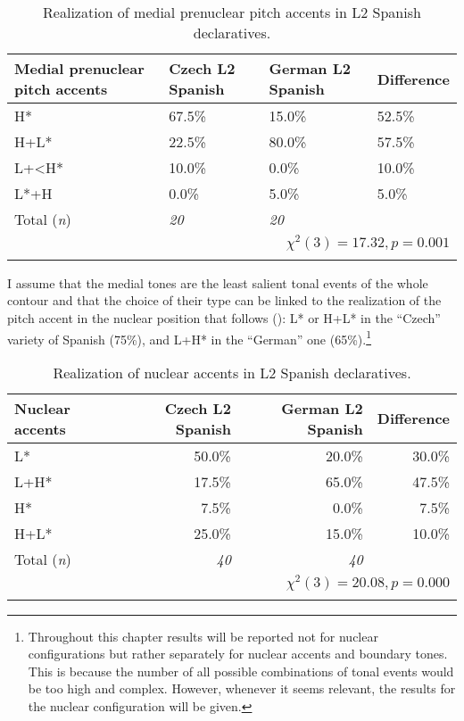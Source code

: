 \begin{table}
\begin{tabularx}{\textwidth}{lYYY}

\lsptoprule

{Medial prenuclear pitch accents} & {Czech L2 Spanish} & {German L2 Spanish} & {Difference}\\
\midrule
H* &  67.5\% &  15.0\% &  52.5\%\\
H+L* &  22.5\% &  80.0\% &  57.5\%\\
L+<H* &  10.0\% &  0.0\% &  10.0\%\\
L*+H &  0.0\% & 5.0\% &  5.0\%\\
\midrule
Total (\textit{n}) & {\itshape 20} & {\itshape 20} &  \\
\\
\lspbottomrule
\end{tabularx}

\caption{Realization of medial prenuclear pitch accents in L2 Spanish declaratives.}
\label{tab:4.3}
\end{table}

I assume that the medial tones are the least salient tonal events of the whole contour and that the choice of their type can be linked to the realization of the pitch accent in the nuclear position that follows (): L* or H+L* in the “Czech” variety of Spanish (75\%), and L+H* in the “German” one (65\%).\footnote{Throughout this chapter results will be reported not for nuclear configurations but rather separately for nuclear accents and boundary tones. This is because the number of all possible combinations of tonal events would be too high and complex. However, whenever it seems relevant, the results for the nuclear configuration will be given.}\largerpage{}

\begin{table}
\begin{tabularx}{\textwidth}{Qrrr}

\lsptoprule

{Nuclear accents} & {Czech L2 Spanish} & {German L2 Spanish} & {Difference}\\
\midrule
L* &  50.0\% &  20.0\% &  30.0\%\\
L+H* &  17.5\% &  65.0\% &  47.5\%\\
H* &  7.5\% &  0.0\% & 7.5\%\\
H+L* &  25.0\% &  15.0\% &  10.0\%\\
\midrule
Total (\textit{n}) & {\itshape 40} & {\itshape 40} &  \\
\\
\lspbottomrule
\end{tabularx}

\caption{Realization of nuclear accents in L2 Spanish declaratives.}
\label{tab:4.4}
\end{table}

